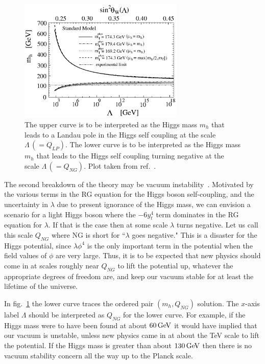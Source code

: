 \documentclass[12pt]{article}
\def\gev{\, {\rm GeV}}
\begin{document}
\begin{figure}[t]
\begin{center}
\includegraphics[width=0.7\textwidth]{SM}
\vspace{0.3cm}
\caption{The upper curve is to be interpreted as the Higgs mass $m_h$ that leads to a Landau pole in the Higgs self coupling at the scale $\Lambda\, (=Q_{LP})$. The lower curve is to be interpreted as the Higgs mass $m_h$ that leads to the Higgs self coupling turning negative at the scale $\Lambda\, (=Q_{NG})$. Plot taken from ref.~\cite{Tobe:2002zj}.
\label{fig:nightmare}}
\end{center}
\end{figure}


The second breakdown of the theory may be vacuum instability~\cite{Cabibbo:1979ay,Sher:1988mj,Altarelli:1994rb,Tobe:2002zj}.
Motivated by the various terms in the RG equation for the Higgs boson self-coupling, and the uncertainty in $\lambda$ due to present ignorance of the Higgs mass, we can envision a scenario for a light Higgs boson where the $-6y_t^4$ term dominates in the RG equation for $\lambda$. If that is the case then at some scale $\lambda$ turns negative. Let us call this scale $Q_{NG}$ where NG is short for ``$\lambda$ goes negative." This is a disaster for the Higgs potential, since $\lambda \phi^4$ is the only important term in the potential when the field values of $\phi$ are very large. Thus, it is to be expected that new physics should come in at scales roughly near $Q_{NG}$ to lift the potential up, whatever the appropriate degrees of freedom are, and keep our vacuum stable for at least the lifetime of the universe.

In fig.~\ref{fig:nightmare} the lower curve traces the ordered pair $(m_h,Q_{NG})$ solution. The $x$-axis label $\Lambda$ should be interpreted as $Q_{NG}$ for the lower curve. For example, if the Higgs mass were to have been found at about $60\gev$ it would have implied that our vacuum is unstable, unless new physics came in at about the TeV scale to lift the potential. If the Higgs mass is greater than about $130\gev$ then there is no vacuum stability concern all the way up to the Planck scale. 
\end{document}

